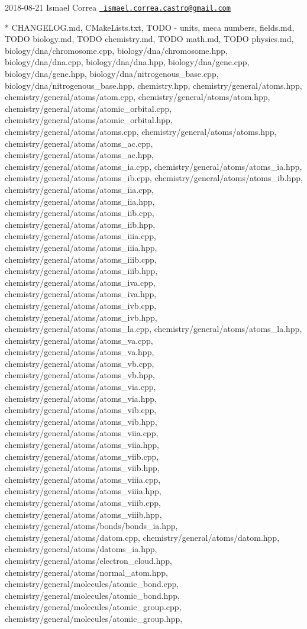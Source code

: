  2018-\/08-\/21 Ismael Correa \href{mailto:ismael.correa.castro@gmail.com}{\texttt{ ismael.\+correa.\+castro@gmail.\+com}} \begin{DoxyVerb}* CHANGELOG.md, CMakeLists.txt, TODO - units, meca numbers,
fields.md, TODO biology.md, TODO chemistry.md, TODO math.md, TODO
physics.md, biology/dna/chromosome.cpp, biology/dna/chromosome.hpp,
biology/dna/dna.cpp, biology/dna/dna.hpp, biology/dna/gene.cpp,
biology/dna/gene.hpp, biology/dna/nitrogenous_base.cpp,
biology/dna/nitrogenous_base.hpp, chemistry.hpp,
chemistry/general/atoms.hpp, chemistry/general/atoms/atom.cpp,
chemistry/general/atoms/atom.hpp,
chemistry/general/atoms/atomic_orbital.cpp,
chemistry/general/atoms/atomic_orbital.hpp,
chemistry/general/atoms/atoms.cpp,
chemistry/general/atoms/atoms.hpp,
chemistry/general/atoms/atoms_ac.cpp,
chemistry/general/atoms/atoms_ac.hpp,
chemistry/general/atoms/atoms_ia.cpp,
chemistry/general/atoms/atoms_ia.hpp,
chemistry/general/atoms/atoms_ib.cpp,
chemistry/general/atoms/atoms_ib.hpp,
chemistry/general/atoms/atoms_iia.cpp,
chemistry/general/atoms/atoms_iia.hpp,
chemistry/general/atoms/atoms_iib.cpp,
chemistry/general/atoms/atoms_iib.hpp,
chemistry/general/atoms/atoms_iiia.cpp,
chemistry/general/atoms/atoms_iiia.hpp,
chemistry/general/atoms/atoms_iiib.cpp,
chemistry/general/atoms/atoms_iiib.hpp,
chemistry/general/atoms/atoms_iva.cpp,
chemistry/general/atoms/atoms_iva.hpp,
chemistry/general/atoms/atoms_ivb.cpp,
chemistry/general/atoms/atoms_ivb.hpp,
chemistry/general/atoms/atoms_la.cpp,
chemistry/general/atoms/atoms_la.hpp,
chemistry/general/atoms/atoms_va.cpp,
chemistry/general/atoms/atoms_va.hpp,
chemistry/general/atoms/atoms_vb.cpp,
chemistry/general/atoms/atoms_vb.hpp,
chemistry/general/atoms/atoms_via.cpp,
chemistry/general/atoms/atoms_via.hpp,
chemistry/general/atoms/atoms_vib.cpp,
chemistry/general/atoms/atoms_vib.hpp,
chemistry/general/atoms/atoms_viia.cpp,
chemistry/general/atoms/atoms_viia.hpp,
chemistry/general/atoms/atoms_viib.cpp,
chemistry/general/atoms/atoms_viib.hpp,
chemistry/general/atoms/atoms_viiia.cpp,
chemistry/general/atoms/atoms_viiia.hpp,
chemistry/general/atoms/atoms_viiib.cpp,
chemistry/general/atoms/atoms_viiib.hpp,
chemistry/general/atoms/bonds/bonds_ia.hpp,
chemistry/general/atoms/datom.cpp,
chemistry/general/atoms/datom.hpp,
chemistry/general/atoms/datoms_ia.hpp,
chemistry/general/atoms/electron_cloud.hpp,
chemistry/general/atoms/normal_atom.hpp,
chemistry/general/molecules/atomic_bond.cpp,
chemistry/general/molecules/atomic_bond.hpp,
chemistry/general/molecules/atomic_group.cpp,
chemistry/general/molecules/atomic_group.hpp,

\end{DoxyVerb}
